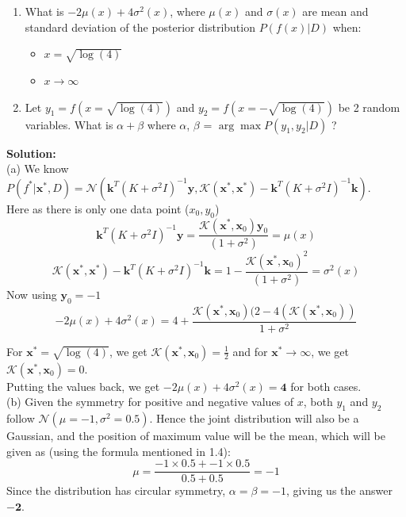 \documentclass[12pt]{article}
\begin{document}
\begin{enumerate}[label=(\alph*)]
    \item What is $-2\mu(x) + 4\sigma^2(x)$, where $\mu(x)$ and $\sigma(x)$ are mean and standard deviation of the posterior distribution $P(f(x)|D)$ when:
    \begin{itemize}
        \item $x = \sqrt{\log(4)}$
        \item $x \rightarrow \infty$
    \end{itemize}
    \item Let $y_1 = f(x = \sqrt{\log(4)})$ and $y_2 = f(x = -\sqrt{\log(4)})$ be 2 random variables. What is $\alpha + \beta$ where $\alpha$, $\beta$ = $\arg \max P(y_1,y_2|D)$ ?
\end{enumerate}

\noindent \textbf{Solution:} \\

\noindent (a) We know \( P(f^*|\mathbf{x}^*,D) = \mathcal{N} \left( \mathbf{k}^T (K + \sigma^2 I)^{-1} \mathbf{y}, \mathcal{K}(\mathbf{x}^*, \mathbf{x}^*) - \mathbf{k}^T (K + \sigma^2 I)^{-1} \mathbf{k} \right). \) \\
Here as there is only one data point (\(x_0,y_0\))
\[ \mathbf{k}^T(K + \sigma^2 I)^{-1}\mathbf{y} = \frac{\mathcal{K}(\mathbf{x}^*, \mathbf{x}_0)\mathbf{y}_0}{(1 + \sigma^2 )} = \mu(x)  \]
\[\mathcal{K}(\mathbf{x}^*, \mathbf{x}^*) - \mathbf{k}^T (K + \sigma^2 I)^{-1} \mathbf{k} = 1-\frac{{\mathcal{K}(\mathbf{x}^*, \mathbf{x}_0)}^2}{(1 + \sigma^2 )} = \sigma^2(x)\]
Now using \( \mathbf{y}_0= -1\) \[-2\mu(x) + 4 \sigma^2(x) = 4 +\frac{\mathcal{K}(\mathbf{x}^*, \mathbf{x}_0)(2-4(\mathcal{K}(\mathbf{x}^*, \mathbf{x}_0))}{1+\sigma^2}  \]

\noindent For \(\mathbf{x}^*=\sqrt{\log(4)}\), we get \(\mathcal{K}(\mathbf{x}^*, \mathbf{x}_0)=\frac{1}{2} \) and for \(\mathbf{x}^*\rightarrow{} \infty \), we get \(\mathcal{K}(\mathbf{x}^*, \mathbf{x}_0)=0 \). \\
Putting the values back, we get \(-2\mu(x)+4\sigma^2(x)= \mathbf{4} \) for both cases. \\

\noindent (b) Given the symmetry for positive and negative values of $x$, both $y_1$ and $y_2$ follow $\mathcal{N}(\mu = -1, \sigma^2 = 0.5)$. Hence the joint distribution will also be a Gaussian, and the position of maximum value will be the mean, which will be given as (using the formula mentioned in 1.4): \[ \mu = \frac{-1 \times 0.5 + -1 \times 0.5}{0.5 + 0.5} = -1 \]
Since the distribution has circular symmetry, $\alpha = \beta = -1$, giving us the answer $\mathbf{-2}$.
\end{document}
